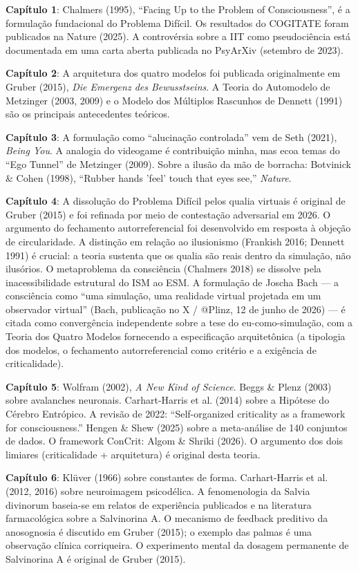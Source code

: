 \documentclass[11pt, twoside, openright]{book}
\begin{document}
\textbf{Capítulo 1}: Chalmers (1995), ``Facing Up to the Problem of Consciousness'', é a formulação fundacional do Problema Difícil. Os resultados do COGITATE foram publicados na Nature (2025). A controvérsia sobre a IIT como pseudociência está documentada em uma carta aberta publicada no PsyArXiv (setembro de 2023).

\textbf{Capítulo 2}: A arquitetura dos quatro modelos foi publicada originalmente em Gruber (2015), \textit{Die Emergenz des Bewusstseins}. A Teoria do Automodelo de Metzinger (2003, 2009) e o Modelo dos Múltiplos Rascunhos de Dennett (1991) são os principais antecedentes teóricos.

\textbf{Capítulo 3}: A formulação como ``alucinação controlada'' vem de Seth (2021), \textit{Being You}. A analogia do videogame é contribuição minha, mas ecoa temas do ``Ego Tunnel'' de Metzinger (2009). Sobre a ilusão da mão de borracha: Botvinick \& Cohen (1998), ``Rubber hands 'feel' touch that eyes see,'' \textit{Nature}.

\textbf{Capítulo 4}: A dissolução do Problema Difícil pelos qualia virtuais é original de Gruber (2015) e foi refinada por meio de contestação adversarial em 2026. O argumento do fechamento autorreferencial foi desenvolvido em resposta à objeção de circularidade. A distinção em relação ao ilusionismo (Frankish 2016; Dennett 1991) é crucial: a teoria sustenta que os qualia são reais dentro da simulação, não ilusórios. O metaproblema da consciência (Chalmers 2018) se dissolve pela inacessibilidade estrutural do ISM ao ESM. A formulação de Joscha Bach --- a consciência como ``uma simulação, uma realidade virtual projetada em um observador virtual'' (Bach, publicação no X / @Plinz, 12 de junho de 2026) --- é citada como convergência independente sobre a tese do eu-como-simulação, com a Teoria dos Quatro Modelos fornecendo a especificação arquitetônica (a tipologia dos modelos, o fechamento autorreferencial como critério e a exigência de criticalidade).

\textbf{Capítulo 5}: Wolfram (2002), \textit{A New Kind of Science}. Beggs \& Plenz (2003) sobre avalanches neuronais. Carhart-Harris et al. (2014) sobre a Hipótese do Cérebro Entrópico. A revisão de 2022: ``Self-organized criticality as a framework for consciousness.'' Hengen \& Shew (2025) sobre a meta-análise de 140 conjuntos de dados. O framework ConCrit: Algom \& Shriki (2026). O argumento dos dois limiares (criticalidade + arquitetura) é original desta teoria.

\textbf{Capítulo 6}: Klüver (1966) sobre constantes de forma. Carhart-Harris et al. (2012, 2016) sobre neuroimagem psicodélica. A fenomenologia da Salvia divinorum baseia-se em relatos de experiência publicados e na literatura farmacológica sobre a Salvinorina A. O mecanismo de feedback preditivo da anosognosia é discutido em Gruber (2015); o exemplo das palmas é uma observação clínica corriqueira. O experimento mental da dosagem permanente de Salvinorina A é original de Gruber (2015).
\end{document}
